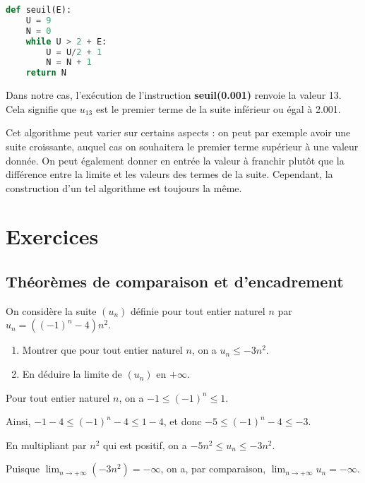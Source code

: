\documentclass[11pt,fleqn, openany]{book} %
\begin{document}
\begin{example}
\begin{lstlisting}[language=python]
def seuil(E):
	U = 9
	N = 0
	while U > 2 + E:
		U = U/2 + 1
		N = N + 1
	return N
\end{lstlisting}

Dans notre cas, l'exécution de l'instruction \textbf{seuil(0.001)} renvoie la valeur 13. Cela signifie que $u_{13}$ est le premier terme de la suite inférieur ou égal à 2.001.\end{example}

Cet algorithme peut varier sur certains aspects : on peut par exemple avoir une suite croissante, auquel cas on souhaitera le premier terme supérieur à une valeur donnée. On peut également donner en entrée la valeur à franchir plutôt que la différence entre la limite et les valeurs des termes de la suite. Cependant, la construction d'un tel algorithme est toujours la même.

\chapter{Exercices}


\section*{Théorèmes de comparaison et d'encadrement}

\begin{exercise}[topic=lim11]On considère la suite $(u_n)$ définie pour tout entier naturel $n$ par $u_n=((-1)^n-4)n^2$.
\begin{enumerate}
\item Montrer que pour tout entier naturel $n$, on a $u_n \leqslant -3n^2$.
\item En déduire la limite de $(u_n)$ en $+\infty$.
\end{enumerate}\end{exercise}

\begin{solution}Pour tout entier naturel $n$, on a $-1 \leqslant (-1)^n \leqslant 1$. 

Ainsi, $-1-4 \leqslant (-1)^n -4\leqslant 1-4$, et donc $-5 \leqslant (-1)^n-4 \leqslant -3$.

En multipliant par $n^2$ qui est positif, on a $-5n^2 \leqslant u_n \leqslant -3n^2$.

Puisque $\displaystyle\lim_{n \to + \infty} (-3n^2)=-\infty$, on a, par comparaison, $\displaystyle\lim_{n \to + \infty}u_n=-\infty$.\end{solution}
\end{document}
